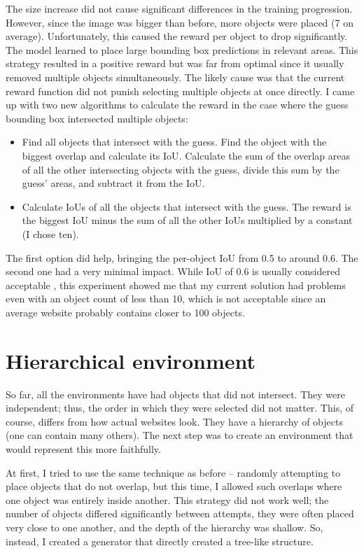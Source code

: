 \documentclass[
  digital,     %
  oneside,     %
  nosansbold,  %
  nocolorbold, %
  lof,         %
  lot,         %
]{fithesis4}
\begin{document}
The size increase did not cause significant differences in the training progression. However, since the image was bigger than before, more objects were placed (7 on average). Unfortunately, this caused the reward per object to drop significantly. The model learned to place large bounding box predictions in relevant areas. This strategy resulted in a positive reward but was far from optimal since it usually removed multiple objects simultaneously. The likely cause was that the current reward function did not punish selecting multiple objects at once directly. I came up with two new algorithms to calculate the reward in the case where the guess bounding box intersected multiple objects:

\begin{itemize}
    \item Find all objects that intersect with the guess. Find the object with the biggest overlap and calculate its IoU. Calculate the sum of the overlap areas of all the other intersecting objects with the guess, divide this sum by the guess' areas, and subtract it from the IoU.
    \item Calculate IoUs of all the objects that intersect with the guess. The reward is the biggest IoU minus the sum of all the other IoUs multiplied by a constant (I chose ten).
\end{itemize}

The first option did help, bringing the per-object IoU from 0.5 to around 0.6. The second one had a very minimal impact. While IoU of 0.6 is usually considered acceptable \cite[p. 291]{DLforVisualSystems}, this experiment showed me that my current solution had problems even with an object count of less than 10, which is not acceptable since an average website probably contains closer to 100 objects.

\section{Hierarchical environment}
\label{sec:hierarchical-env}

So far, all the environments have had objects that did not intersect. They were independent; thus, the order in which they were selected did not matter. This, of course, differs from how actual websites look. They have a hierarchy of objects (one can contain many others). The next step was to create an environment that would represent this more faithfully.

At first, I tried to use the same technique as before -- randomly attempting to place objects that do not overlap, but this time, I allowed such overlaps where one object was entirely inside another. This strategy did not work well; the number of objects differed significantly between attempts, they were often placed very close to one another, and the depth of the hierarchy was shallow. So, instead, I created a generator that directly created a tree-like structure.
\end{document}
